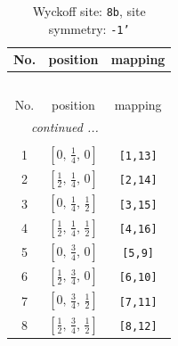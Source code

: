 \documentclass[fleqn,8pt]{jsarticle}
\begin{document}
\begin{longtable}{ccc}
\caption{Wyckoff site: {\tt 8b}, site symmetry: {\tt -1'}}
 \\
 \hline \hline
No. & position & mapping \\ \hline \endfirsthead

\multicolumn{2}{l}{\tablename\ \thetable{}} \\
 \hline \hline
No. & position & mapping \\ \hline \endhead

 \hline \hline
\multicolumn{2}{r}{\footnotesize\it continued ...} \\ \endfoot

 \hline \hline
\multicolumn{2}{r}{} \\ \endlastfoot

1 & $\left[ 0,\, \frac{1}{4},\, 0 \right]$ & {\tt [1,13]} \\ \hline
2 & $\left[ \frac{1}{2},\, \frac{1}{4},\, 0 \right]$ & {\tt [2,14]} \\ \hline
3 & $\left[ 0,\, \frac{1}{4},\, \frac{1}{2} \right]$ & {\tt [3,15]} \\ \hline
4 & $\left[ \frac{1}{2},\, \frac{1}{4},\, \frac{1}{2} \right]$ & {\tt [4,16]} \\ \hline
5 & $\left[ 0,\, \frac{3}{4},\, 0 \right]$ & {\tt [5,9]} \\ \hline
6 & $\left[ \frac{1}{2},\, \frac{3}{4},\, 0 \right]$ & {\tt [6,10]} \\ \hline
7 & $\left[ 0,\, \frac{3}{4},\, \frac{1}{2} \right]$ & {\tt [7,11]} \\ \hline
8 & $\left[ \frac{1}{2},\, \frac{3}{4},\, \frac{1}{2} \right]$ & {\tt [8,12]} \\
\end{longtable}
\renewcommand{\arraystretch}{1.2}
\end{document}
